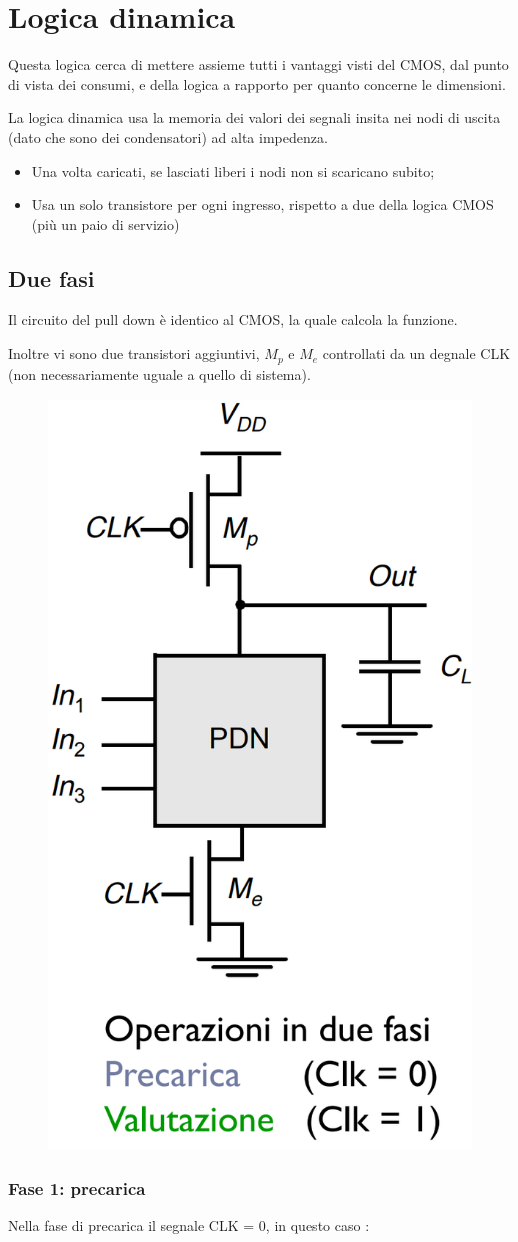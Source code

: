 \chapter{Logica dinamica}
 Questa logica cerca di mettere assieme tutti i vantaggi visti del CMOS, dal punto di vista dei consumi, e della logica a rapporto per quanto concerne le dimensioni. 


 La	logica dinamica usa la	memoria dei valori dei segnali insita nei nodi di	uscita (dato che sono dei condensatori) ad	alta impedenza.

\begin{itemize}
    \item Una	volta	caricati,	se	lasciati	liberi	i	nodi	non	si	scaricano	subito;
    \item  Usa	un	solo	transistore	per	ogni	ingresso, rispetto a due della logica CMOS	(più	un	paio	di	servizio)
\end{itemize}


\section{Due fasi}

Il circuito del pull down è identico al CMOS, la quale calcola la funzione. 

Inoltre vi sono due transistori aggiuntivi, $M_p $ e $M_e$ controllati da un degnale CLK (non necessariamente uguale a quello di sistema).

\begin{figure}[htbp]
    \centering
    \includegraphics[width=0.25\linewidth]{img/due_fasi.png}
\end{figure}

\subsection{Fase 1: precarica}

Nella fase di precarica il segnale CLK = 0, in questo caso :

